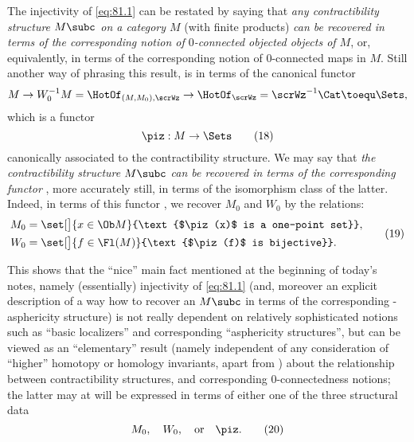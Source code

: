 The injectivity of \eqref{eq:81.1} can be restated by saying that
\emph{any contractibility structure $M\subc$ on a category $M$} (with
finite products) \emph{can be recovered in terms of the corresponding
  notion of $0$-connected objected objects of $M$}, or, equivalently,
in terms of the corresponding notion of $0$-connected maps in
$M$. Still another way of phrasing this result, is in terms of the
canonical functor
\[ M\to W_0^{-1}M=\HotOf_{(M,M_0),\scrWz} \to \HotOf_\scrWz =
\scrWz^{-1}\Cat \toequ \Sets,\]
which is a functor
\begin{equation}
  \label{eq:81.18}
  \piz:M\to\Sets\tag{18}
\end{equation}
canonically associated to the contractibility structure. We may say
that \emph{the contractibility structure $M\subc$ can be recovered in
  terms of the corresponding functor \piz}, more accurately still, in
terms of the isomorphism class of the latter. Indeed, in terms of this
functor \piz, we recover $M_0$ and $W_0$ by the relations:
\begin{equation}
  \label{eq:81.19}
  \begin{split}
    M_0 &= \set[\big]{x\in\Ob M}{\text{$\piz(x)$ is a one-point set}},\\
    W_0 &= \set[\big]{f\in\Fl(M)}{\text{$\piz(f)$ is bijective}}.
  \end{split}\tag{19}
\end{equation}

This shows that the ``nice'' main fact mentioned at the beginning of
today's notes, namely (essentially) injectivity of \eqref{eq:81.1}
(and, moreover an explicit description of a way how to recover an
$M\subc$ in terms of the corresponding \scrW-asphericity structure) is
not really dependent on relatively sophisticated notions such as
``basic localizers'' and corresponding ``asphericity structures'', but
can be viewed as an ``elementary'' result (namely independent of any
consideration of ``higher'' homotopy or homology invariants, apart
from \piz) about the relationship between contractibility structures,
and corresponding $0$-connectedness notions; the latter may at will be
expressed in terms of either one of the three structural data
\begin{equation}
  \label{eq:81.20}
  M_0, \quad W_0, \quad\text{or}\quad \piz.\tag{20}
\end{equation}

